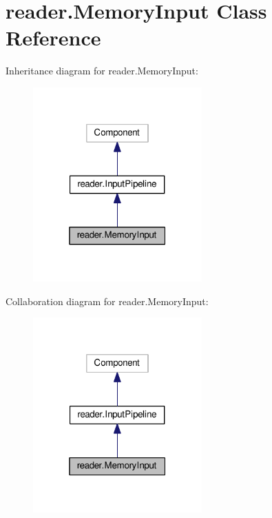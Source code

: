 \hypertarget{classreader_1_1MemoryInput}{}\section{reader.\+Memory\+Input Class Reference}
\label{classreader_1_1MemoryInput}


Inheritance diagram for reader.\+Memory\+Input\+:
\nopagebreak
\begin{figure}[H]
\begin{center}
\leavevmode
\includegraphics[width=184pt]{classreader_1_1MemoryInput__inherit__graph}
\end{center}
\end{figure}


Collaboration diagram for reader.\+Memory\+Input\+:
\nopagebreak
\begin{figure}[H]
\begin{center}
\leavevmode
\includegraphics[width=184pt]{classreader_1_1MemoryInput__coll__graph}
\end{center}
\end{figure}
